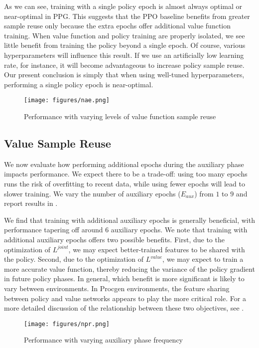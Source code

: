 \documentclass{article}
\begin{document}
As we can see, training with a single policy epoch is almost always optimal or near-optimal in PPG. This suggests that the PPO baseline benefits from greater sample reuse only because the extra epochs offer additional value function training. When value function and policy training are properly isolated, we see little benefit from training the policy beyond a single epoch. Of course, various hyperparameters will influence this result. If we use an artificially low learning rate, for instance, it will become advantageous to increase policy sample reuse. Our present conclusion is simply that when using well-tuned hyperparameters, performing a single policy epoch is near-optimal.

\begin{figure*}
\centering
\texttt{[image: figures/nae.png]}
\caption{Performance with varying levels of value function sample reuse}
\label{fig:nae}
\end{figure*}

\subsection{Value Sample Reuse} \label{sec:value_sr}

We now evaluate how performing additional epochs during the auxiliary phase impacts performance. We expect there to be a trade-off: using too many epochs runs the risk of overfitting to recent data, while using fewer epochs will lead to slower training. We vary the number of auxiliary epochs ($E_{aux}$) from $1$ to $9$ and report results in .

We find that training with additional auxiliary epochs is generally beneficial, with performance tapering off around 6 auxiliary epochs. We note that training with additional auxiliary epochs offers two possible benefits. First, due to the optimization of $L^{joint}$, we may expect better-trained features to be shared with the policy. Second, due to the optimization of $L^{value}$, we may expect to train a more accurate value function, thereby reducing the variance of the policy gradient in future policy phases. In general, which benefit is more significant is likely to vary between environments. In Procgen environments, the feature sharing between policy and value networks appears to play the more critical role. For a more detailed discussion of the relationship between these two objectives, see .

\begin{figure*}
\centering
\texttt{[image: figures/npr.png]}
\caption{Performance with varying auxiliary phase frequency}
\label{fig:npr}
\end{figure*}
\end{document}
